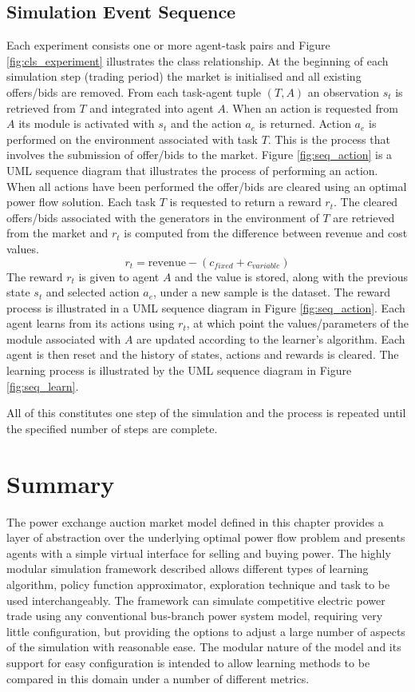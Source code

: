\subsection{Simulation Event Sequence}
%
Each experiment consists one or more agent-task pairs and Figure
\ref{fig:cls_experiment} illustrates the class relationship.
%
At the beginning of each simulation step (trading period) the market is
initialised and all existing offers/bids are removed.  From each task-agent tuple $(T,A)$ an
observation $s_t$ is retrieved from $T$ and integrated into agent $A$.  When
an action is requested from $A$ its module is activated with $s_t$ and the
action $a_e$ is returned.  Action $a_e$ is performed on the environment
associated with task $T$.  This is the process that involves the submission of
offer/bids to the market.  Figure \ref{fig:seq_action} is a UML sequence
diagram that illustrates the process of performing an action.
%
When all actions have been performed the offer/bids are cleared using an
optimal power flow solution.  Each task $T$ is requested to return a reward
$r_t$. The cleared offers/bids associated with the generators in the environment of $T$ are retrieved from the market and $r_t$ is computed from
the difference between revenue and cost values.
\begin{equation}
r_t = \mbox{revenue} - (c_{fixed} + c_{variable})
\end{equation}
The reward $r_t$ is given to agent $A$ and the value is stored, along with the
previous state $s_t$ and selected action $a_e$, under a new sample is the
dataset.  The reward process is illustrated in a UML sequence diagram in Figure
\ref{fig:seq_action}.
%
Each agent learns from its actions using $r_t$, at which point the
values/parameters of the module associated with $A$ are updated according to
the learner's algorithm.  Each agent is then reset and the history of states,
actions and rewards is cleared.  The learning process is illustrated by the UML
sequence diagram in  Figure \ref{fig:seq_learn}.

All of this constitutes one step of the simulation and the process is repeated
until the specified number of steps are complete.

\section{Summary}
The power exchange auction market model defined in this chapter provides a
layer of abstraction over the underlying optimal power flow problem and
presents agents with a simple virtual interface for selling
and buying power.  The highly modular simulation framework described allows
different types of learning algorithm, policy function approximator,
exploration technique and task to be used interchangeably. The framework can
simulate competitive electric power trade using any conventional bus-branch
power system model, requiring very little configuration, but providing the
options to adjust a large number of aspects of the simulation with reasonable
ease. The modular nature of the model and its support for easy
configuration is intended to allow learning methods to be compared in this
domain under a number of different metrics.

